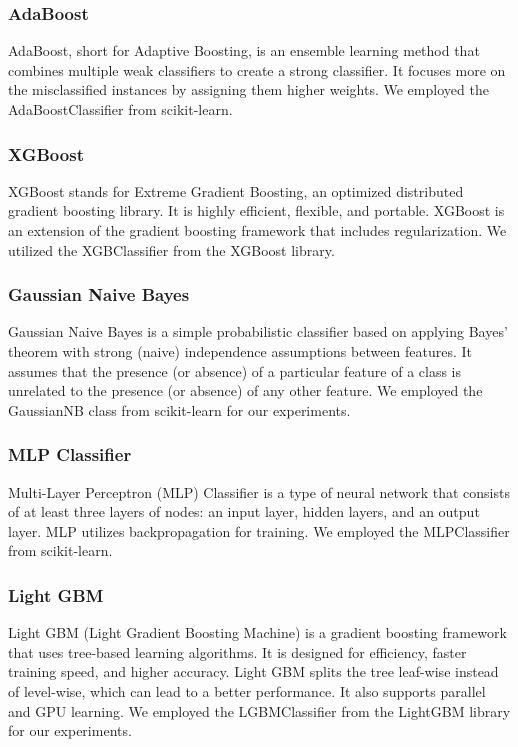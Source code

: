 \documentclass[a4paper, 24pt]{article}
\begin{document}
\subsubsection{AdaBoost}
AdaBoost, short for Adaptive Boosting, is an ensemble learning method that combines multiple weak classifiers to create a strong classifier. It focuses more on the misclassified instances by assigning them higher weights. We employed the AdaBoostClassifier from scikit-learn.

\subsubsection{XGBoost}
XGBoost stands for Extreme Gradient Boosting, an optimized distributed gradient boosting library. It is highly efficient, flexible, and portable. XGBoost is an extension of the gradient boosting framework that includes regularization. We utilized the XGBClassifier from the XGBoost library.

\subsubsection{Gaussian Naive Bayes}
Gaussian Naive Bayes is a simple probabilistic classifier based on applying Bayes' theorem with strong (naive) independence assumptions between features. It assumes that the presence (or absence) of a particular feature of a class is unrelated to the presence (or absence) of any other feature. We employed the GaussianNB class from scikit-learn for our experiments.

\subsubsection{MLP Classifier}
Multi-Layer Perceptron (MLP) Classifier is a type of neural network that consists of at least three layers of nodes: an input layer, hidden layers, and an output layer. MLP utilizes backpropagation for training. We employed the MLPClassifier from scikit-learn.
\subsubsection{Light GBM}
Light GBM (Light Gradient Boosting Machine) is a gradient boosting framework that uses tree-based learning algorithms. It is designed for efficiency, faster training speed, and higher accuracy. Light GBM splits the tree leaf-wise instead of level-wise, which can lead to a better performance. It also supports parallel and GPU learning. We employed the LGBMClassifier from the LightGBM library for our experiments.
\end{document}
